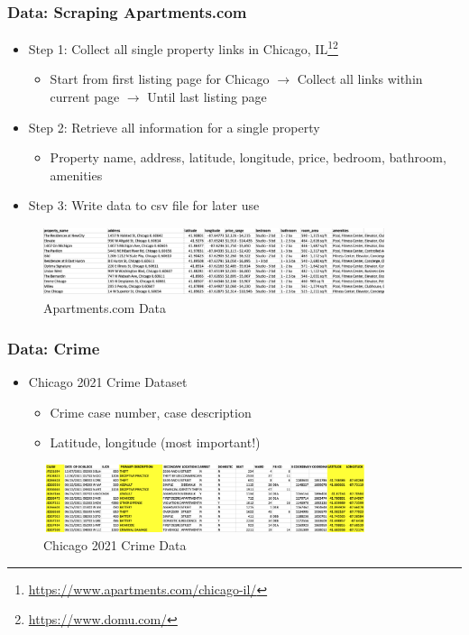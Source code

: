 \documentclass{beamer}
\begin{document}
\begin{frame}
	\frametitle{Data: Scraping Apartments.com}
	\begin{itemize}
		\item Step 1: Collect all single property links in Chicago, IL\footnote{\url{https://www.apartments.com/chicago-il/}}\footnote{\url{https://www.domu.com/}}
		\begin{itemize}
			\item Start from first listing page for Chicago $\rightarrow$ Collect all links within current page $\rightarrow$ Until last listing page
		\end{itemize}
		\item Step 2: Retrieve all information for a single property
		\begin{itemize}
			\item Property name, address, latitude, longitude, price, bedroom, bathroom, amenities
		\end{itemize}
		\item Step 3: Write data to csv file for later use
	\end{itemize}
	\begin{figure}[H]
		\centering
		\includegraphics[height=2cm, width=10cm]{figs/apartmentsdata.png}
		\caption{Apartments.com Data}
	\end{figure}
\end{frame}

\begin{frame}
	\frametitle{Data: Crime}
	\begin{itemize}
		\item Chicago 2021 Crime Dataset
		\begin{itemize}
			\item Crime case number, case description
			\item Latitude, longitude (most important!)
		\end{itemize}
	\end{itemize}
	\begin{figure}[H]
		\centering
		\includegraphics[height=2cm, width=9.5cm]{figs/crimedata.png}
		\caption{Chicago 2021 Crime Data}
	\end{figure}
\end{frame}
\end{document}

